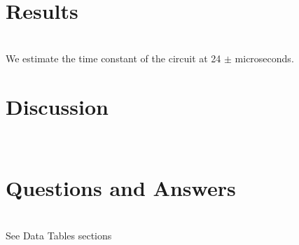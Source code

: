 \documentclass{article}
\begin{document}
	\section{Results}\hfill\\
		We estimate the time constant of the circuit at 24 $\pm$ microseconds.
\endgroup
\begingroup
	\section{Discussion}\hfill\\
		\let\clearpage\relax
			
\endgroup
\begingroup
	\section{Questions and Answers }\hfill\\
		See Data Tables sections
\endgroup
\end{document}
